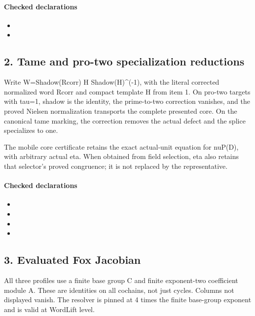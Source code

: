 \paragraph{Checked declarations}
\begin{itemize}
\item {}
\item {}
\end{itemize}

\subsection*{2. Tame and pro-two specialization reductions}
Write W=Shadow(Rcorr) H Shadow(H)\textasciicircum{}(-1), with the literal corrected normalized word Rcorr and compact template H from item 1. On pro-two targets with tau=1, shadow is the identity, the prime-to-two correction vanishes, and the proved Nielsen normalization transports the complete presented core. On the canonical tame marking, the correction removes the actual defect and the splice specializes to one.

The mobile core certificate retains the exact actual-unit equation for nuP(D), with arbitrary actual eta. When obtained from field selection, eta also retains that selector's proved congruence; it is not replaced by the representative.

\paragraph{Checked declarations}
\begin{itemize}
\item {}
\item {}
\item {}
\item {}
\end{itemize}

\subsection*{3. Evaluated Fox Jacobian}
All three profiles use a finite base group C and finite exponent-two coefficient module A. These are identities on all cochains, not just cycles. Columns not displayed vanish. The resolver is pinned at 4 times the finite base-group exponent and is valid at WordLift level.

